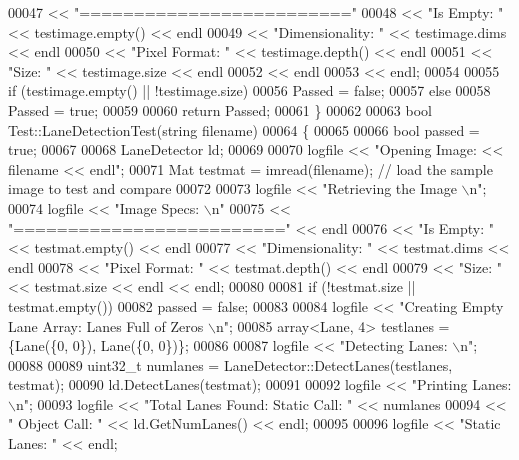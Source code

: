 \begin{DoxyCode}
00047           << \textcolor{stringliteral}{"========================="}
00048           << \textcolor{stringliteral}{"Is Empty:       "} << testimage.empty() << endl
00049           << \textcolor{stringliteral}{"Dimensionality: "} << testimage.dims << endl
00050           << \textcolor{stringliteral}{"Pixel Format:   "} << testimage.depth() << endl
00051           << \textcolor{stringliteral}{"Size:           "} << testimage.size << endl
00052           << endl
00053           << endl;
00054 
00055   \textcolor{keywordflow}{if} (testimage.empty() || !testimage.size)
00056     Passed = \textcolor{keyword}{false};
00057   \textcolor{keywordflow}{else}
00058     Passed = \textcolor{keyword}{true};
00059 
00060   \textcolor{keywordflow}{return} Passed;
00061 \}
00062 
00063 \textcolor{keywordtype}{bool} Test::LaneDetectionTest(string filename)
00064 \{
00065 
00066   \textcolor{keywordtype}{bool} passed = \textcolor{keyword}{true};
00067 
00068   LaneDetector ld;
00069 
00070   logfile << \textcolor{stringliteral}{"Opening Image: << filename << endl"};
00071   Mat testmat = imread(filename); \textcolor{comment}{// load the sample image to test and compare}
00072 
00073   logfile << \textcolor{stringliteral}{"Retrieving the Image \(\backslash\)n"};
00074   logfile << \textcolor{stringliteral}{"Image Specs: \(\backslash\)n"}
00075           << \textcolor{stringliteral}{"========================="} << endl
00076           << \textcolor{stringliteral}{"Is Empty:       "} << testmat.empty() << endl
00077           << \textcolor{stringliteral}{"Dimensionality: "} << testmat.dims << endl
00078           << \textcolor{stringliteral}{"Pixel Format:   "} << testmat.depth() << endl
00079           << \textcolor{stringliteral}{"Size:           "} << testmat.size << endl << endl;
00080 
00081   \textcolor{keywordflow}{if} (!testmat.size || testmat.empty())
00082     passed = \textcolor{keyword}{false};
00083 
00084   logfile << \textcolor{stringliteral}{"Creating Empty Lane Array: Lanes Full of Zeros \(\backslash\)n"};
00085   array<Lane, 4> testlanes = \{Lane(\{0, 0\}), Lane(\{0, 0\})\};
00086 
00087   logfile << \textcolor{stringliteral}{"Detecting Lanes: \(\backslash\)n"};
00088 
00089   uint32\_t numlanes = LaneDetector::DetectLanes(testlanes, testmat);
00090   ld.DetectLanes(testmat);
00091 
00092   logfile << \textcolor{stringliteral}{"Printing Lanes: \(\backslash\)n"};
00093   logfile << \textcolor{stringliteral}{"Total Lanes Found: Static Call: "} << numlanes
00094           << \textcolor{stringliteral}{" Object Call: "} << ld.GetNumLanes() << endl;
00095 
00096   logfile << \textcolor{stringliteral}{"Static Lanes: "} << endl;

\end{DoxyCode}
